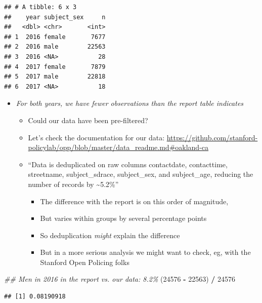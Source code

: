 \documentclass[
]{article}
\newenvironment{Shaded}{\begin{snugshade}}{\end{snugshade}}
\newcommand{\CommentTok}[1]{\textcolor[rgb]{0.56,0.35,0.01}{\textit{#1}}}
\newcommand{\DecValTok}[1]{\textcolor[rgb]{0.00,0.00,0.81}{#1}}
\newcommand{\NormalTok}[1]{#1}
\newcommand{\OperatorTok}[1]{\textcolor[rgb]{0.81,0.36,0.00}{\textbf{#1}}}
\newcommand{\StringTok}[1]{\textcolor[rgb]{0.31,0.60,0.02}{#1}}
\providecommand{\tightlist}{%
  \setlength{\itemsep}{0pt}\setlength{\parskip}{0pt}}
\begin{document}
\begin{verbatim}
## # A tibble: 6 x 3
##    year subject_sex     n
##   <dbl> <chr>       <int>
## 1  2016 female       7677
## 2  2016 male        22563
## 3  2016 <NA>           28
## 4  2017 female       7879
## 5  2017 male        22818
## 6  2017 <NA>           18
\end{verbatim}

\begin{itemize}
\tightlist
\item
  \emph{For both years, we have fewer observations than the report table indicates}

  \begin{itemize}
  \item
    Could our data have been pre-filtered?
  \item
    Let's check the documentation for our data: \url{https://github.com/stanford-policylab/opp/blob/master/data_readme.md\#oakland-ca}
  \item
    ``Data is deduplicated on raw columns contactdate, contacttime, streetname, subject\_sdrace, subject\_sex, and subject\_age, reducing the number of records by \textasciitilde5.2\%''

    \begin{itemize}
    \tightlist
    \item
      The difference with the report is on this order of magnitude,
    \item
      But varies within groups by several percentage points
    \item
      So deduplication \emph{might} explain the difference
    \item
      But in a more serious analysis we might want to check, eg, with the Stanford Open Policing folks
    \end{itemize}
  \end{itemize}
\end{itemize}

\begin{Shaded}
\begin{Highlighting}[]
\CommentTok{\#\# Men in 2016 in the report vs. our data: 8.2\%}
\NormalTok{(}\DecValTok{24576} \OperatorTok{{-}}\StringTok{ }\DecValTok{22563}\NormalTok{) }\OperatorTok{/}\StringTok{ }\DecValTok{24576}
\end{Highlighting}
\end{Shaded}

\begin{verbatim}
## [1] 0.08190918
\end{verbatim}
\end{document}

